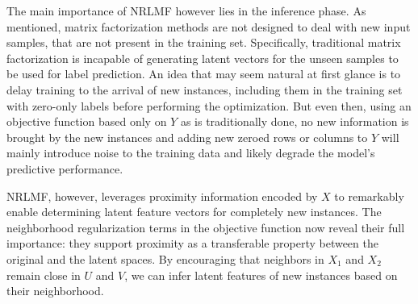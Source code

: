 \begin{apendicesenv}
\algNRLMFTrain

The main importance of NRLMF however lies in the inference phase. As mentioned, matrix factorization methods are not designed to deal with new input samples, that are not present in the training set. Specifically, traditional matrix factorization is incapable of generating latent vectors for the unseen samples to be used for label prediction. An idea that may seem natural at first glance is to delay training to the arrival of new instances, including them in the training set with zero-only labels before performing the optimization. But even then, using an objective function based only on $Y$ as is traditionally done, no new information is brought by the new instances and adding new zeroed rows or columns to $Y$ will mainly introduce noise to the training data and likely degrade the model's predictive performance.

NRLMF, however, leverages proximity information encoded by $X$ to remarkably enable determining latent feature vectors for completely new instances. The neighborhood regularization terms in the objective function now reveal their full importance: they support proximity as a transferable property between the original and the latent spaces. By encouraging that neighbors in $X_1$ and $X_2$ remain close in $U$ and $V$, we can infer latent features of new instances based on their neighborhood.


\end{apendicesenv}
